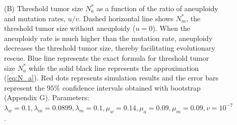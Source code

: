 \documentclass[12pt]{extarticle}
\begin{document}
\begin{figure}
{(B) Threshold tumor size $N_a^*$ as a function of the ratio of aneuploidy and mutation rates, $u/v$. Dashed horizontal line shows $N^*_m$, the threshold tumor size without aneuploidy ($u=0$). When the aneuploidy rate is much higher than the mutation rate, aneuploidy decreases the threshold tumor size, thereby facilitating evolutionary rescue. Blue line represents the exact formula for threshold tumor size $N_a^*$ while the solid black line represents the approximation (\cref{eq:N_a}). Red dots represents simulation results and the error bars represent the $95\%$ confidence intervals obtained with bootstrap (Appendix G).  Parameters: $\lambda_w=0.1,\lambda_m=0.0899,\lambda_m=0.1,\mu_w=0.14,\mu_a=0.09,\mu_m=0.09, v=10^{-7}$. 
}
\label{rescue_threshold}
\end{figure}

\end{document}

